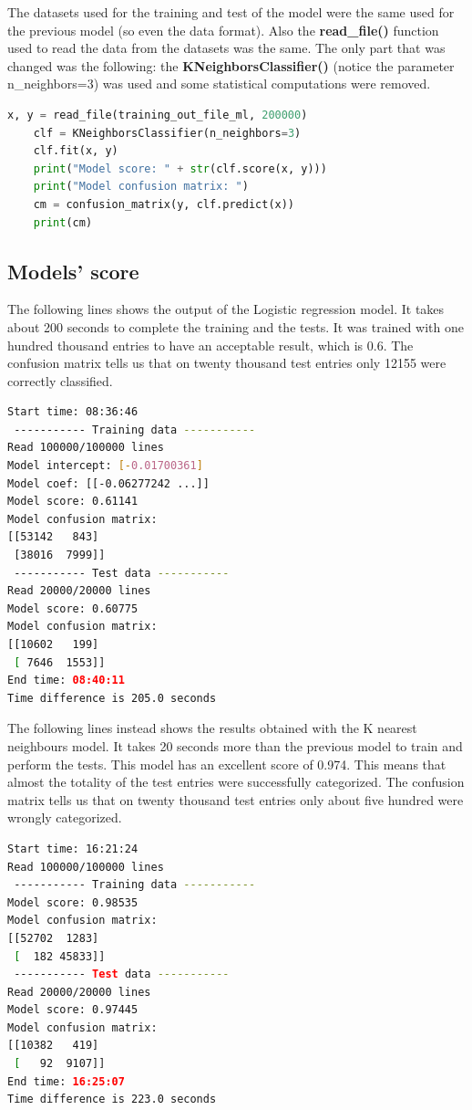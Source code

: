 The datasets used for the training and test of the model were the same used for the previous model (so even the data format). Also the \textbf{read\_file()} function used to read the data from the datasets was the same. The only part that was changed was the following: the \textbf{KNeighborsClassifier()} (notice the parameter n\_neighbors=3) was used and some statistical computations were removed.
\begin{lstlisting}[language=python,firstnumber=72]
    x, y = read_file(training_out_file_ml, 200000)
    clf = KNeighborsClassifier(n_neighbors=3)
    clf.fit(x, y)
    print("Model score: " + str(clf.score(x, y)))
    print("Model confusion matrix: ")
    cm = confusion_matrix(y, clf.predict(x))
    print(cm)
\end{lstlisting}

\subsection{Models' score}
The following lines shows the output of the Logistic regression model. It takes about 200 seconds to complete the training and the tests. It was trained with one hundred thousand entries to have an acceptable result, which is 0.6. The confusion matrix tells us that on twenty thousand test entries only 12155 were correctly classified.
\begin{lstlisting}[language=bash]
Start time: 08:36:46
 ----------- Training data -----------
Read 100000/100000 lines
Model intercept: [-0.01700361]
Model coef: [[-0.06277242 ...]]
Model score: 0.61141
Model confusion matrix: 
[[53142   843]
 [38016  7999]]
 ----------- Test data -----------
Read 20000/20000 lines
Model score: 0.60775
Model confusion matrix: 
[[10602   199]
 [ 7646  1553]]
End time: 08:40:11
Time difference is 205.0 seconds
\end{lstlisting}

The following lines instead shows the results obtained with the K nearest neighbours model. It takes 20 seconds more than the previous model to train and perform the tests. This model has an excellent score of 0.974. This means that almost the totality of the test entries were successfully categorized. The confusion matrix tells us that on twenty thousand test entries only about five hundred were wrongly categorized. 
\begin{lstlisting}[language=bash]
Start time: 16:21:24
Read 100000/100000 lines
 ----------- Training data -----------
Model score: 0.98535
Model confusion matrix: 
[[52702  1283]
 [  182 45833]]
 ----------- Test data -----------
Read 20000/20000 lines
Model score: 0.97445
Model confusion matrix: 
[[10382   419]
 [   92  9107]]
End time: 16:25:07
Time difference is 223.0 seconds
\end{lstlisting}

